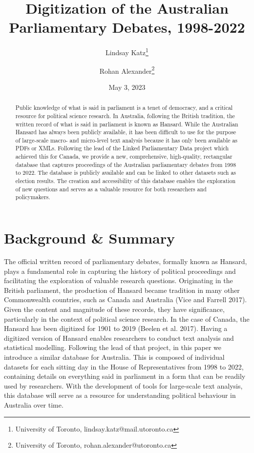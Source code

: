 \documentclass[
  letterpaper,
  DIV=11,
  numbers=noendperiod]{scrartcl}
\title{Digitization of the Australian Parliamentary Debates, 1998-2022}
\author{Lindsay Katz\footnote{University of Toronto,
  lindsay.katz@mail.utoronto.ca} \and Rohan Alexander\footnote{University
  of Toronto, rohan.alexander@utoronto.ca}}
\date{May 3, 2023}
\begin{document}
\maketitle
\begin{abstract}
Public knowledge of what is said in parliament is a tenet of democracy,
and a critical resource for political science research. In Australia,
following the British tradition, the written record of what is said in
parliament is known as Hansard. While the Australian Hansard has always
been publicly available, it has been difficult to use for the purpose of
large-scale macro- and micro-level text analysis because it has only
been available as PDFs or XMLs. Following the lead of the Linked
Parliamentary Data project which achieved this for Canada, we provide a
new, comprehensive, high-quality, rectangular database that captures
proceedings of the Australian parliamentary debates from 1998 to 2022.
The database is publicly available and can be linked to other datasets
such as election results. The creation and accessibility of this
database enables the exploration of new questions and serves as a
valuable resource for both researchers and policymakers.
\end{abstract}
\ifdefined\Shaded\renewenvironment{Shaded}{\begin{tcolorbox}[frame hidden, enhanced, interior hidden, borderline west={3pt}{0pt}{shadecolor}, breakable, sharp corners, boxrule=0pt]}{\end{tcolorbox}}\fi

\hypertarget{sec-intro}{%
\section{Background \& Summary}\label{sec-intro}}

The official written record of parliamentary debates, formally known as
Hansard, plays a fundamental role in capturing the history of political
proceedings and facilitating the exploration of valuable research
questions. Originating in the British parliament, the production of
Hansard became tradition in many other Commonwealth countries, such as
Canada and Australia (Vice and Farrell 2017). Given the content and
magnitude of these records, they have significance, particularly in the
context of political science research. In the case of Canada, the
Hansard has been digitized for 1901 to 2019 (Beelen et al. 2017). Having
a digitized version of Hansard enables researchers to conduct text
analysis and statistical modelling. Following the lead of that project,
in this paper we introduce a similar database for Australia. This is
composed of individual datasets for each sitting day in the House of
Representatives from 1998 to 2022, containing details on everything said
in parliament in a form that can be readily used by researchers. With
the development of tools for large-scale text analysis, this database
will serve as a resource for understanding political behaviour in
Australia over time.
\end{document}
